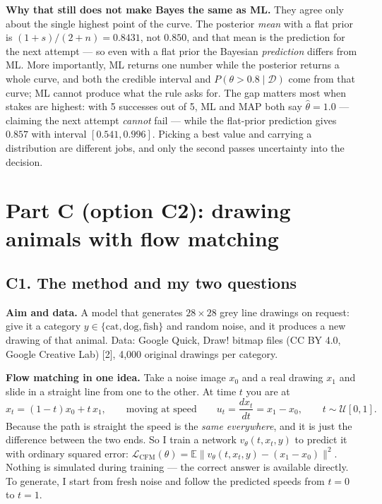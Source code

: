 \documentclass[12pt,a4paper]{article}
\newcommand{\D}{\mathcal{D}}
\begin{document}
\textbf{Why that still does not make Bayes the same as ML.} They agree only about the single highest point of
the curve. The posterior \emph{mean} with a flat prior is $(1{+}s)/(2{+}n)=0.8431$, not $0.850$, and that mean
is the prediction for the next attempt --- so even with a flat prior the Bayesian \emph{prediction} differs from
ML. More importantly, ML returns one number while the posterior returns a whole curve, and both the credible
interval and $P(\theta>0.8\mid\D)$ come from that curve; ML cannot produce what the rule asks for. The gap
matters most when stakes are highest: with 5 successes out of 5, ML and MAP both say $\hat\theta=1.0$ ---
claiming the next attempt \emph{cannot} fail --- while the flat-prior prediction gives $0.857$ with interval
$[0.541,0.996]$. Picking a best value and carrying a distribution are different jobs, and only the second passes
uncertainty into the decision.

\section{Part C (option C2): drawing animals with flow matching}

\subsection{C1. The method and my two questions}

\textbf{Aim and data.} A model that generates $28\times28$ grey line drawings on request: give it a
category $y\in\{\textrm{cat},\textrm{dog},\textrm{fish}\}$ and random noise, and it produces a new
drawing of that animal. Data: Google Quick, Draw! bitmap files (CC BY 4.0, Google Creative Lab) [2], 4{,}000
original drawings per category.

\textbf{Flow matching in one idea.} Take a noise image $x_0$ and a real drawing $x_1$ and slide in a straight
line from one to the other. At time $t$ you are at
\[
x_t=(1-t)x_0+t\,x_1,\qquad\text{moving at speed}\qquad u_t=\frac{dx_t}{dt}=x_1-x_0,\qquad t\sim\mathcal{U}[0,1].
\]
Because the path is straight the speed is the \emph{same everywhere}, and it is just the difference between
the two ends. So I train a network $v_\theta(t,x_t,y)$ to predict it with ordinary squared error:
$\mathcal{L}_{\text{CFM}}(\theta)=\mathbb{E}\big\|v_\theta(t,x_t,y)-(x_1-x_0)\big\|^2$. Nothing is simulated
during training --- the correct answer is available directly. To generate, I start from fresh noise and follow
the predicted speeds from $t{=}0$ to $t{=}1$.
\end{document}
